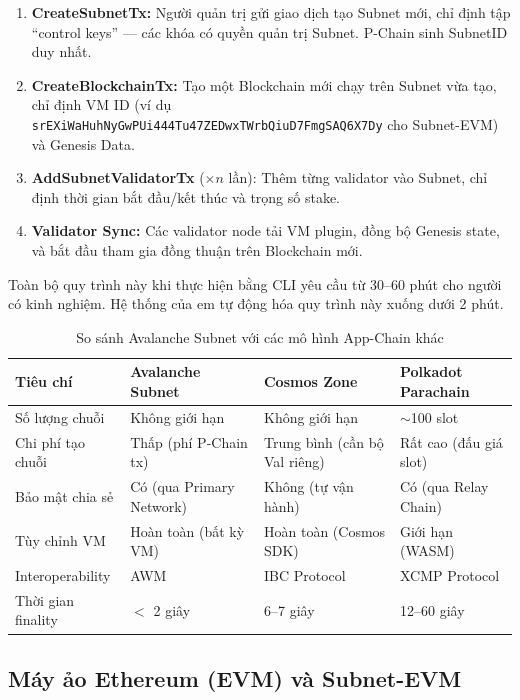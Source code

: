 \begin{enumerate}
    \item \textbf{CreateSubnetTx:} Người quản trị gửi giao dịch tạo Subnet mới, chỉ định tập ``control keys'' --- các khóa có quyền quản trị Subnet. P-Chain sinh SubnetID duy nhất.
    \item \textbf{CreateBlockchainTx:} Tạo một Blockchain mới chạy trên Subnet vừa tạo, chỉ định VM ID (ví dụ \texttt{srEXiWaHuhNyGwPUi444Tu47ZEDwxTWrbQiuD7FmgSAQ6X7Dy} cho Subnet-EVM) và Genesis Data.
    \item \textbf{AddSubnetValidatorTx} ($\times n$ lần): Thêm từng validator vào Subnet, chỉ định thời gian bắt đầu/kết thúc và trọng số stake.
    \item \textbf{Validator Sync:} Các validator node tải VM plugin, đồng bộ Genesis state, và bắt đầu tham gia đồng thuận trên Blockchain mới.
\end{enumerate}

Toàn bộ quy trình này khi thực hiện bằng CLI yêu cầu từ 30--60 phút cho người có kinh nghiệm. Hệ thống của em tự động hóa quy trình này xuống dưới 2 phút.

\begin{table}[H]
\centering
\caption{So sánh Avalanche Subnet với các mô hình App-Chain khác}
\label{tab:appchain_comparison}
\begin{tabular}{|l|p{3.2cm}|p{3.2cm}|p{3.5cm}|}
\hline
\textbf{Tiêu chí} & \textbf{Avalanche Subnet} & \textbf{Cosmos Zone} & \textbf{Polkadot Parachain} \\ \hline
Số lượng chuỗi & Không giới hạn & Không giới hạn & $\sim$100 slot \\ \hline
Chi phí tạo chuỗi & Thấp (phí P-Chain tx) & Trung bình (cần bộ Val riêng) & Rất cao (đấu giá slot) \\ \hline
Bảo mật chia sẻ & Có (qua Primary Network) & Không (tự vận hành) & Có (qua Relay Chain) \\ \hline
Tùy chỉnh VM & Hoàn toàn (bất kỳ VM) & Hoàn toàn (Cosmos SDK) & Giới hạn (WASM) \\ \hline
Interoperability & AWM & IBC Protocol & XCMP Protocol \\ \hline
Thời gian finality & $<$ 2 giây & 6--7 giây & 12--60 giây \\ \hline
\end{tabular}
\end{table}

\subsection{Máy ảo Ethereum (EVM) và Subnet-EVM}

